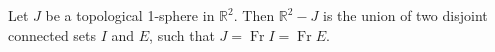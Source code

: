 Let $J$ be a topological 1-sphere in $\mathbb{R}^2$. Then $\mathbb{R}^2 - J$ is the union of two disjoint connected sets $I$ and $E$, such that $J = \operatorname{Fr} I = \operatorname{Fr} E$.
